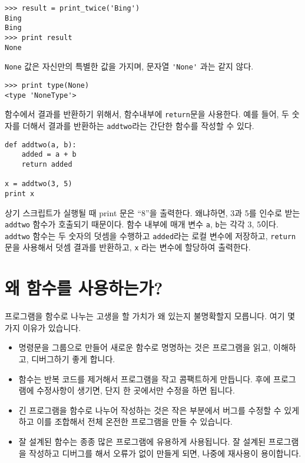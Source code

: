 
\beforeverb
\begin{verbatim}
>>> result = print_twice('Bing')
Bing
Bing
>>> print result
None
\end{verbatim}
\afterverb
%

{\tt None} 값은 자신만의 특별한 값을 가지며, 문자열 \verb"'None'" 과는 같지 않다. 

\beforeverb
\begin{verbatim}
>>> print type(None)
<type 'NoneType'>
\end{verbatim}
\afterverb
%

함수에서 결과를 반환하기 위해서, 함수내부에 {\tt return}문을 사용한다.
예를 들어, 두 숫자를 더해서 결과를 반환하는 {\tt addtwo}라는 간단한 함수를 작성할 수 있다. 

\beforeverb
\begin{verbatim}
def addtwo(a, b):
    added = a + b
    return added

x = addtwo(3, 5)
print x
\end{verbatim}
\afterverb
%

상기 스크립트가 실행될 때 print 문은 ``8''을 출력한다. 왜냐하면, 3과 5를 인수로 받는 {\tt addtwo} 함수가 호출되기 때문이다.
함수 내부에 매개 변수 {\tt a}, {\tt b}는 각각 3, 5이다.
 {\tt addtwo} 함수는 두 숫자의 덧셈을 수행하고  {\tt added}라는 로컬 변수에 저장하고, {\tt return}문을 사용해서 덧셈 결과를 반환하고,
  {\tt x} 라는 변수에 할당하여 출력한다.

\section{왜 함수를 사용하는가?}

프로그램을 함수로 나누는 고생을 할 가치가 왜 있는지 불명확할지 모릅니다. 여기 몇 가지 이유가 있습니다.

\begin{itemize}

\item 명령문을 그룹으로 만들어 새로운 함수로 명명하는 것은 프로그램을 읽고, 이해하고, 디버그하기 좋게 합니다. 

\item 함수는 반복 코드를 제거해서 프로그램을 작고 콤팩트하게 만듭니다. 후에 프로그램에 수정사항이 생기면, 단지 한 곳에서만 수정을 하면 됩니다.

\item 긴 프로그램을 함수로 나누어 작성하는 것은 작은 부분에서 버그를 수정할 수 있게 하고 이를 조합해서 전체 온전한 프로그램을 만들 수 있습니다.

\item 잘 설계된 함수는 종종 많은 프로그램에 유용하게 사용됩니다. 잘 설계된 프로그램을 작성하고 디버그를 해서 오류가 없이 만들게 되면, 나중에 재사용이 용이합니다.

\end{itemize}

